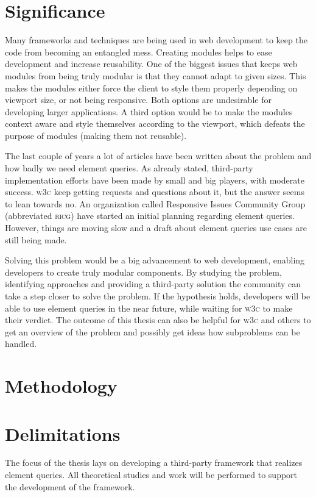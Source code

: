 \documentclass[a4paper,11pt]{kth-mag}
\begin{document}
    \section{Significance}
      Many frameworks and techniques are being used in web development to keep the code from becoming an entangled mess.
      Creating modules helps to ease development and increase reusability.
      One of the biggest issues that keeps web modules from being truly modular is that they cannot adapt to given sizes.
      This makes the modules either force the client to style them properly depending on viewport size, or not being responsive.
      Both options are undesirable for developing larger applications.
      A third option would be to make the modules context aware and style themselves according to the viewport, which defeats the purpose of modules (making them not reusable).

      The last couple of years a lot of articles have been written about the problem and how badly we need element queries.
      As already stated, third-party implementation efforts have been made by small and big players, with moderate success.
      \textsc{w3c} keep getting requests and questions about it, but the answer seems to lean towards no.
      An organization called Responsive Issues Community Group (abbreviated \textsc{ricg}) have started an initial planning regarding element queries.
      However, things are moving slow and a draft about element queries use cases are still being made.

      Solving this problem would be a big advancement to web development, enabling developers to create truly modular components.
      By studying the problem, identifying approaches and providing a third-party solution the community can take a step closer to solve the problem.
      If the hypothesis holds, developers will be able to use element queries in the near future, while waiting for \textsc{w3c} to make their verdict.
      The outcome of this thesis can also be helpful for \textsc{w3c} and others to get an overview of the problem and possibly get ideas how subproblems can be handled.
    \section{Methodology}
    \section{Delimitations}
      The focus of the thesis lays on developing a third-party framework that realizes element queries.
      All theoretical studies and work will be performed to support the development of the framework.
\end{document}

